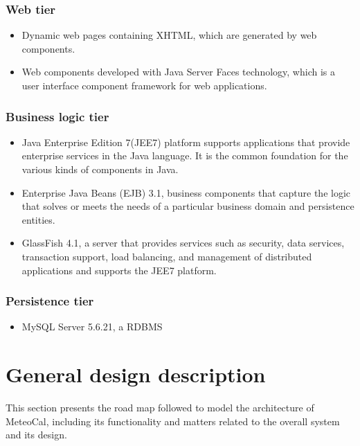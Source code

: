 \documentclass[10pt,a4paper,titlepage]{article}
\begin{document}
\subsubsection{Web tier}
\begin{itemize}
\item Dynamic web pages containing XHTML, which are generated by web components.
\item Web components developed with Java Server Faces technology, which is a user interface component framework for web applications.
\end{itemize}

\subsubsection{Business logic tier}
\begin{itemize}
\item Java Enterprise Edition 7(JEE7) platform supports applications that provide enterprise services in the Java language. It is the common foundation for the various kinds of components in Java.
\item Enterprise Java Beans (EJB) 3.1, business components that capture the logic that solves or meets the needs of a particular business domain and persistence entities.
\item GlassFish 4.1, a server that provides services such as security, data services, transaction support, load balancing, and management of distributed applications and supports the JEE7 platform.
\end{itemize}

\subsubsection{Persistence tier}
\begin{itemize}
\item MySQL Server 5.6.21, a RDBMS
\end{itemize}

\section{General design description}
This section presents the road map followed to model the architecture of MeteoCal, including its functionality and matters related to the overall system and its design.
\end{document}
